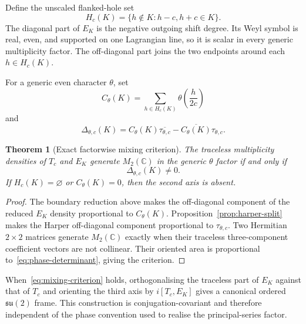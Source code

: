 \documentclass[11pt,a4paper]{article}
\newtheorem{theorem}{Theorem}[section]
\theoremstyle{definition}
\theoremstyle{remark}
\newcommand{\C}{\mathbb{C}}
\begin{document}
Define the unscaled flanked-hole set
\begin{equation}
  H_c(K)=\{h\notin K:h-c,h+c\in K\}.
  \label{eq:holes}
\end{equation}
The diagonal part of $E_K$ is the negative outgoing shift degree.
Its Weyl symbol is real, even, and supported on one Lagrangian line, so it is scalar in every
generic multiplicity factor.
The off-diagonal part joins the two endpoints around each $h\in H_c(K)$.

For a generic even character $\theta$, set
\begin{equation}
  C_\theta(K)=\sum_{h\in H_c(K)}\theta\!\left(\frac{h}{2c}\right)
  \label{eq:boundary-character-sum}
\end{equation}
and
\begin{equation}
  \Delta_{\theta,c}(K)
  =C_\theta(K)\overline{\tau_{\theta,c}}
  -\overline{C_\theta(K)}\tau_{\theta,c}.
  \label{eq:phase-determinant}
\end{equation}

\begin{theorem}[Exact factorwise mixing criterion]
  \label{thm:mixing}
  The traceless multiplicity densities of $T_c$ and $E_K$ generate $M_2(\C)$ in the generic
  $\theta$ factor if and only if
  \begin{equation}
    \Delta_{\theta,c}(K)\ne0.
    \label{eq:mixing-criterion}
  \end{equation}
  If $H_c(K)=\varnothing$ or $C_\theta(K)=0$, then the second axis is absent.
\end{theorem}

\begin{proof}
  The boundary reduction above makes the off-diagonal component of the reduced $E_K$
  density proportional to $C_\theta(K)$.
  Proposition~\ref{prop:harper-split} makes the Harper off-diagonal component proportional
  to $\tau_{\theta,c}$.
  Two Hermitian $2\times2$ matrices generate $M_2(\C)$ exactly when their traceless
  three-component coefficient vectors are not collinear.
  Their oriented area is proportional to~\eqref{eq:phase-determinant}, giving the
  criterion.
\end{proof}

When~\eqref{eq:mixing-criterion} holds, orthogonalising the traceless part of $E_K$ against
that of $T_c$ and orienting the third axis by $i[T_c,E_K]$ gives a canonical ordered
$\mathfrak{su}(2)$ frame.
This construction is conjugation-covariant and therefore independent of the phase convention
used to realise the principal-series factor.
\end{document}
